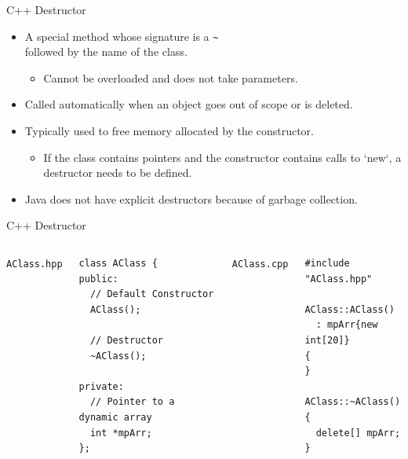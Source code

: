 \documentclass[14pt, aspectratio=1610, hyperref={pdfpagelayout=SinglePage}]{beamer}
\begin{document}
\begin{frame}[fragile]{C++ Destructor}
\begin{itemize}
\item
  A special method whose signature is a \lstinline{~} \\followed by the name of the class.
  \begin{itemize}
    \item Cannot be overloaded and does not take parameters.
  \end{itemize}

\item
  Called automatically when an object goes out of scope or is deleted.

\item
  Typically used to free memory allocated by the constructor.
  \begin{itemize}
    \item If the class contains pointers and the constructor contains calls to `new`, a destructor needs to be defined.
  \end{itemize}
\item
  Java does not have explicit destructors because of garbage collection.
\end{itemize}
\end{frame}

\begin{frame}[fragile]{C++ Destructor}
  \begin{columns}[t]
    \texttt{AClass.hpp}
\begin{lstlisting}[basicstyle=\small\ttfamily]
class AClass {
public:
  // Default Constructor
  AClass();

  // Destructor
  ~AClass();

private:
  // Pointer to a dynamic array
  int *mpArr;
};
\end{lstlisting}
  \texttt{AClass.cpp}
\begin{lstlisting}[basicstyle=\small\ttfamily]
#include "AClass.hpp"

AClass::AClass()
  : mpArr{new int[20]}
{
}

AClass::~AClass()
{
  delete[] mpArr;
}
\end{lstlisting}
  \end{columns}
\end{frame}
\end{document}
